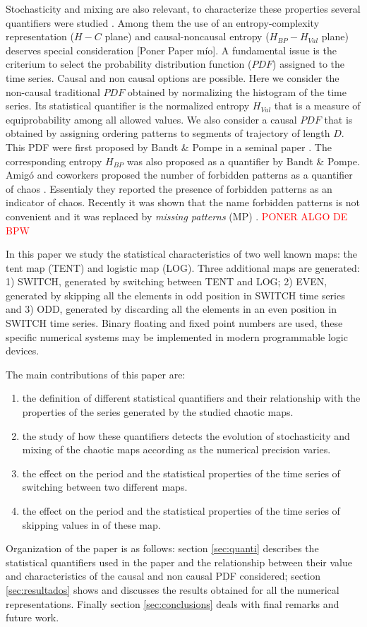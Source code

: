 Stochasticity and mixing are also relevant, to characterize these properties several quantifiers were studied \cite{DeMicco2009}.
Among them the use of an entropy-complexity representation ($H-C$ plane) and causal-noncausal entropy ($H_{BP}-H_{Val}$ plane) deserves special consideration \cite{Rosso2007C,DeMicco2008,DeMicco2011,DeMicco2009,Rosso2009}[Poner Paper mío].
A fundamental issue is the criterium to select the probability distribution function ($PDF$) assigned to the time series.
Causal and non causal options are possible.
Here we consider the non-causal traditional $PDF$ obtained by normalizing the histogram of the time series.
Its statistical quantifier is the normalized entropy $H_{Val}$ that is a measure of equiprobability among all allowed values.
We also consider a causal $PDF$ that is obtained by assigning ordering patterns to segments of trajectory of length $D$.
This PDF were first proposed by Bandt \& Pompe in a seminal paper \cite{Pompe2002}.
The corresponding entropy $H_{BP}$ was also proposed as a quantifier by Bandt \& Pompe.
Amig\'o and coworkers proposed the number of forbidden patterns as a quantifier of chaos \cite{Amigo2007b}.
Essentialy they reported the presence of forbidden patterns as an indicator of chaos.
Recently it was shown that the name forbidden patterns is not convenient and it was replaced by \textit{missing patterns }(MP) \cite{Rosso2012b}.
\textcolor{red}{PONER ALGO DE BPW}

In this paper we study the statistical characteristics of two well known maps: the tent map (TENT) and logistic map (LOG).
Three additional maps are generated: 1) SWITCH, generated by switching between TENT and LOG; 2) EVEN, generated by skipping all the elements in odd position in SWITCH time series and 3) ODD, generated by discarding all the elements in an even position in SWITCH time series.
Binary floating and fixed point numbers are used, these specific numerical systems may be implemented in modern programmable logic devices.

The main contributions of this paper are:
\begin{enumerate}
\item the definition of different statistical quantifiers and their relationship with the properties of the series generated by the studied chaotic maps.
\item the study of how these quantifiers detects the evolution of stochasticity and mixing of the chaotic maps according as the numerical precision varies.
\item the effect on the period and the statistical properties of the time series of switching between two different maps.
\item the effect on the period and the statistical properties of the time series of skipping values in of these map.
\end{enumerate}

Organization of the paper is as follows:
section \ref{sec:quanti} describes the statistical quantifiers used in the paper and the relationship between their value and characteristics of the causal and non causal PDF considered;
section \ref{sec:resultados} shows and discusses the results obtained for all the numerical representations.
Finally section \ref{sec:conclusions} deals with final remarks and future work.